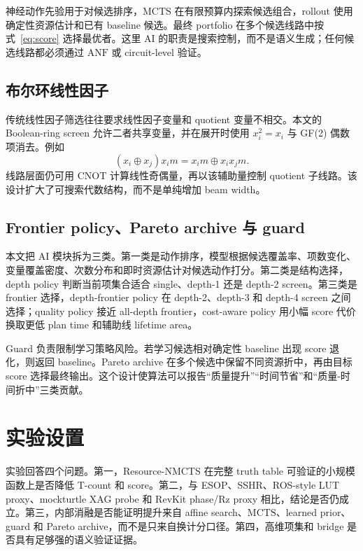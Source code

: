 \documentclass[UTF8,fontset=macnew,11pt]{ctexart}
\newcommand{\method}{Resource-NMCTS}
\newcommand{\anf}{\ensuremath{\mathrm{ANF}}}
\newcommand{\mcts}{\ensuremath{\mathrm{MCTS}}}
\newcommand{\xor}{\ensuremath{\oplus}}
\newcommand{\ttable}{truth table}
\begin{document}
神经动作先验用于对候选排序，\mcts{} 在有限预算内探索候选组合，rollout 使用确定性资源估计和已有 baseline 候选。最终 portfolio 在多个候选线路中按式~\eqref{eq:score} 选择最优者。这里 AI 的职责是搜索控制，而不是语义生成；任何候选线路都必须通过 \anf{} 或 circuit-level 验证。

\subsection{布尔环线性因子}

传统线性因子筛选往往要求线性因子变量和 quotient 变量不相交。本文的 Boolean-ring screen 允许二者共享变量，并在展开时使用 $x_i^2=x_i$ 与 GF(2) 偶数项消去。例如
\begin{equation}
  (x_i\xor x_j)x_i m = x_i m \xor x_i x_j m .
  \label{eq:boolean-ring}
\end{equation}
线路层面仍可用 CNOT 计算线性奇偶量，再以该辅助量控制 quotient 子线路。该设计扩大了可搜索代数结构，而不是单纯增加 beam width。

\subsection{Frontier policy、Pareto archive 与 guard}

本文把 AI 模块拆为三类。第一类是动作排序，模型根据候选覆盖率、项数变化、变量覆盖密度、次数分布和即时资源估计对候选动作打分。第二类是结构选择，depth policy 判断当前项集合适合 single、depth-1 还是 depth-2 screen。第三类是 frontier 选择，depth-frontier policy 在 depth-2、depth-3 和 depth-4 screen 之间选择；quality policy 接近 all-depth frontier，cost-aware policy 用小幅 score 代价换取更低 plan time 和辅助线 lifetime area。

Guard 负责限制学习策略风险。若学习候选相对确定性 baseline 出现 score 退化，则返回 baseline。Pareto archive 在多个候选中保留不同资源折中，再由目标 score 选择最终输出。这个设计使算法可以报告“质量提升”“时间节省”和“质量-时间折中”三类贡献。

\section{实验设置}

实验回答四个问题。第一，\method{} 在完整 \ttable{} 可验证的小规模函数上是否降低 T-count 和 score。第二，与 ESOP、SSHR、ROS-style LUT proxy、mockturtle XAG probe 和 RevKit phase/Rz proxy 相比，结论是否仍成立。第三，内部消融是否能证明提升来自 affine search、\mcts{}、learned prior、guard 和 Pareto archive，而不是只来自换计分口径。第四，高维项集和 bridge 是否具有足够强的语义验证证据。
\end{document}
